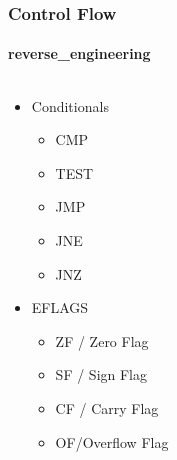 \documentclass[aspectratio=169]{beamer}
\begin{document}
\begin{frame}
  \frametitle{Control Flow}
  \framesubtitle{reverse\_engineering}
  \begin{columns}
    \begin{column}{.5\textwidth}
      \begin{itemize}
        \item{Conditionals}
          \begin{itemize}
          \item{CMP}
          \item{TEST}
          \item{JMP}
          \item{JNE}
          \item{JNZ}
          \end{itemize}
      \item{EFLAGS}
        \begin{itemize}
        \item{ZF / Zero Flag}
        \item{SF / Sign Flag}
        \item{CF / Carry Flag}
        \item{OF/Overflow Flag}
        \end{itemize}
      \end{itemize}
    \end{column}
    \hfill
    \begin{column}{.5\textwidth}
      \begin{center}

\end{center}
\end{column}
\end{columns}
\end{frame}
\end{document}
